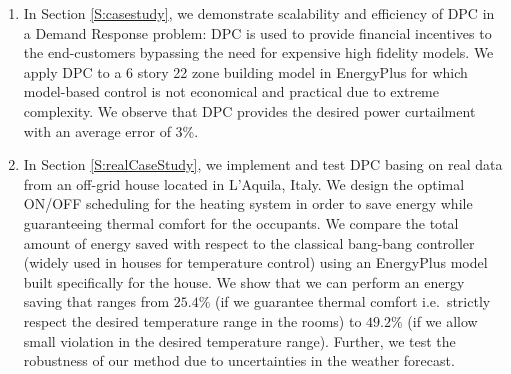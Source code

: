 {\begin{enumerate}
	\item In Section \ref{S:casestudy}, we demonstrate scalability and efficiency of DPC in a Demand Response problem: DPC is used to provide financial incentives to the end-customers bypassing the need for expensive high fidelity models. We apply DPC to a 6 story 22 zone building model in EnergyPlus for which model-based control is not economical and practical due to extreme complexity. We observe that DPC provides the desired power curtailment with an average error of 3\%.
	\item In Section \ref{S:realCaseStudy}, we implement and test DPC basing on real data from an off-grid house located in L'Aquila, Italy. We design the optimal ON/OFF scheduling for the heating system in order to save energy while guaranteeing thermal comfort for the occupants. We compare the total amount of energy saved with respect to the classical bang-bang controller (widely used in houses for temperature control) using an EnergyPlus model built specifically for the house. We show that we can perform an energy saving that ranges from $25.4\%$ (if we guarantee thermal comfort i.e.~strictly respect the desired temperature range in the rooms) to $49.2\%$ (if we allow small violation in the desired temperature range). Further, we test the robustness of our method due to uncertainties in the weather forecast.
\end{enumerate}
}


